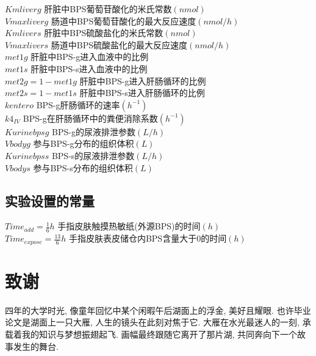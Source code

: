 \documentclass[a4paper,punct=banjiao,twoside]{ctexrep}
\theoremstyle{plain}
\theoremstyle{definition}
\theoremstyle{remark}
\begin{document}
$ Kmliverg$ {\hfill  肝脏中BPS葡萄苷酸化的米氏常数$(nmol)$}\\
$Vmaxliverg$ {\hfill  肠道中BPS葡萄苷酸化的最大反应速度$(nmol/h)$}\\
$ Kmlivers$ {\hfill  肝脏中BPS硫酸盐化的米氏常数$(nmol)$}\\
$Vmaxlivers$ {\hfill  肠道中BPS硫酸盐化的最大反应速度$(nmol/h)$}\\
$met1g $ {\hfill  肝脏中BPS-g进入血液中的比例}\\
$ met1s$ {\hfill  肝脏中BPS-s进入血液中的比例}\\
$met2g = 1 -  met1g$ {\hfill  肝脏中BPS-g进入肝肠循环的比例}\\
$ met2s= 1 -  met1s$ {\hfill  肝脏中BPS-s进入肝肠循环的比例}\\
$ kentero$ {\hfill  BPS-g肝肠循环的速率$(h^{-1})$}\\
$k4_{IV} $ {\hfill  BPS-g在肝肠循环中的粪便消除系数$(h^{-1})$}\\
$ Kurinebpsg$ {\hfill  BPS-g的尿液排泄参数$(L/h)$}\\
$Vbodyg  $ {\hfill  参与BPS-g分布的组织体积$(L)$}\\
$ Kurinebpss$ {\hfill  BPS-s的尿液排泄参数$(L/h)$}\\
$ Vbodys$ {\hfill  参与BPS-s分布的组织体积$(L)$}

\section*{实验设置的常量}
\noindent$Time_{add}=\frac{1}{6}h$ {\hfill  手指皮肤触摸热敏纸(外源BPS)的时间$(h)$}\\
$Time_{expose}=\frac{13}{6}h$ {\hfill  手指皮肤表皮储仓内BPS含量大于0的时间$(h)$}\\

% 

\chapter*{致\quad 谢}
\normalsize
四年的大学时光, 像童年回忆中某个闲暇午后湖面上的浮金, 美好且耀眼. 也许毕业论文是湖面上一只大雁, 人生的镜头在此刻对焦于它.
大雁在水光最迷人的一刻, 承载着我的知识与梦想振翅起飞. 画幅最终跟随它离开了那片湖, 共同奔向下一个故事发生的舞台.
\end{document}
